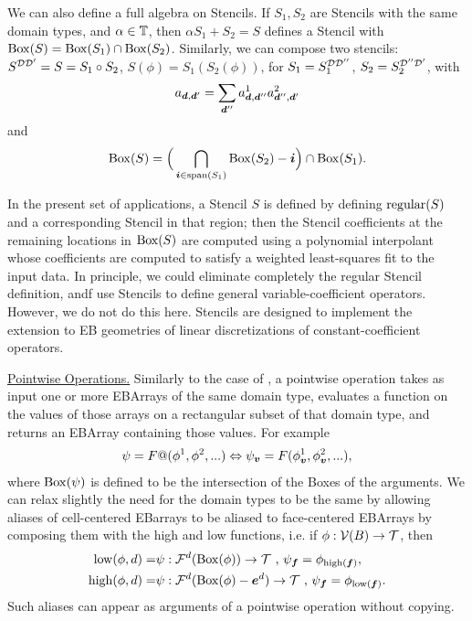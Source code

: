 \documentclass[12pt]{article}
\newcommand{\low}{{\rm{low}}}
\newcommand{\high}{{\rm{high}}}
\newcommand{\regular}{{\rm{regular}}}
\newcommand{\spanEB}{{\rm{span}}}
\newcommand{\vof}{{\mbf{v}}}
\newcommand{\face}{{\mbf{f}}}
\newcommand{\dgen}{{\mbf{d}}}
\begin{document}
We can also define a full algebra on Stencils. If $S_1,S_2$ are Stencils with the same domain types, and $\alpha \in \mathbb{T}$, then
$\alpha S_1 + S_2= S$ defines a Stencil with ${\rm Box}(S) = {\rm Box}(S_1) \cap {\rm Box}(S_2)$. Similarly, we can compose two stencils: $S^{{\mathcal{D}}{\mathcal{D}}'}= S = S_1 \circ S_2$, $S(\phi) = S_1(S_2(\phi))$, for $S_1 = S_1^{{\mathcal{D}}{\mathcal{D}}''}$, $S_2 = S_2^{{\mathcal{D''}}{\mathcal{D}}'}$,
with
\begin{gather*}
a_{\dgen,\dgen'} = \sum \limits_{\dgen ''} a_{\dgen,\dgen''}^1 a_{\dgen'',\dgen'}^2
\end{gather*}
and 
\begin{gather*}
\MBox(S) = \Big(\bigcap \limits_{\mbf{i} \in \spanEB(S_1)} \MBox(S_2) - \mbf{i} \Big) \cap \MBox(S_1).
\end{gather*}

In the present set of applications, a Stencil $S$ is defined by defining $\regular(S)$ and a corresponding  Stencil in that region; then the Stencil coefficients at the remaining locations in ${\rm Box}(S)$ are computed using a polynomial interpolant whose coefficients are computed to satisfy a weighted least-squares fit to the input data. In principle, we could eliminate completely the regular Stencil definition, andf use Stencils to define general variable-coefficient operators. However, we do not do this here. Stencils are designed to implement the extension to EB geometries of linear discretizations of constant-coefficient operators.

\noindent
\underline{Pointwise Operations.} Similarly to the case of , a pointwise operation takes as input one or more EBArrays of the same domain type, evaluates a function on the values of those arrays on a rectangular subset of that domain type, and returns an EBArray containing those values. For example
\begin{gather*}
\psi = F@(\phi^{1},\phi^2, ...) \Leftrightarrow \psi_{\vof} = F(\phi_\vof^1,\phi_\vof^2, ...),
\end{gather*}
where ${\rm Box}(\psi)$ is defined to be the intersection of the Boxes of the arguments.
We can relax slightly the need for the domain types to be the same by allowing aliases of cell-centered EBarrays to be aliased to face-centered EBArrays by composing them with the high and low functions, i.e. if $\phi:{\mathcal{V}}(B) \rightarrow {\mathcal{T}}$, then
\begin{align*}
\low(\phi,d) = & \psi:\mcl{F}^d(\MBox(\phi)) \rightarrow \mcl{T} \cma \psi_\face = \phi_{\high(\face)}, \\ 
\high(\phi,d) = & \psi:\mcl{F}^d(\MBox(\phi)- \mbf{e}^d) \rightarrow \mcl{T} \cma \psi_\face = \phi_{\low(\face)}.
\end{align*}
Such aliases can appear as arguments of a pointwise operation without copying.
\end{document}
